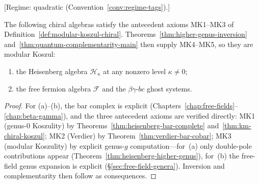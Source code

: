 \begin{proposition}
\label{prop:standard-examples-modular-koszul}
\textup{[Regime: quadratic
\textup{(}Convention~\textup{\ref{conv:regime-tags})}.]}

The following chiral algebras satisfy the antecedent axioms
\textup{MK1--MK3} of Definition~\textup{\ref{def:modular-koszul-chiral}}.
Theorems~\textup{\ref{thm:higher-genus-inversion}}
and~\textup{\ref{thm:quantum-complementarity-main}} then supply
\textup{MK4--MK5}, so they are modular Koszul:
\begin{enumerate}[label=\textup{(\alph*)}]
\item the Heisenberg algebra $\mathcal{H}_\kappa$ at any nonzero level
  $\kappa \neq 0$\textup{;}
\item the free fermion algebra $\mathcal{F}$ and the $\beta\gamma$-$bc$
  ghost systems.
\end{enumerate}
\end{proposition}

\begin{proof}
For (a)--(b), the bar complex is explicit
(Chapters~\ref{chap:free-fields}--\ref{chap:beta-gamma}), and the
three antecedent axioms are verified directly:
MK1 (genus-0 Koszulity) by
Theorems~\ref{thm:heisenberg-bar-complete} and~\ref{thm:km-chiral-koszul};
MK2 (Verdier) by Theorem~\ref{thm:verdier-bar-cobar};
MK3 (modular Koszulity) by explicit genus-$g$ computation---for~(a)
only double-pole contributions appear (Theorem~\ref{thm:heisenberg-higher-genus}),
for~(b) the free-field genus expansion is explicit
(\S\ref{sec:free-field-genera}).
Inversion and complementarity then follow as consequences.
\end{proof}

